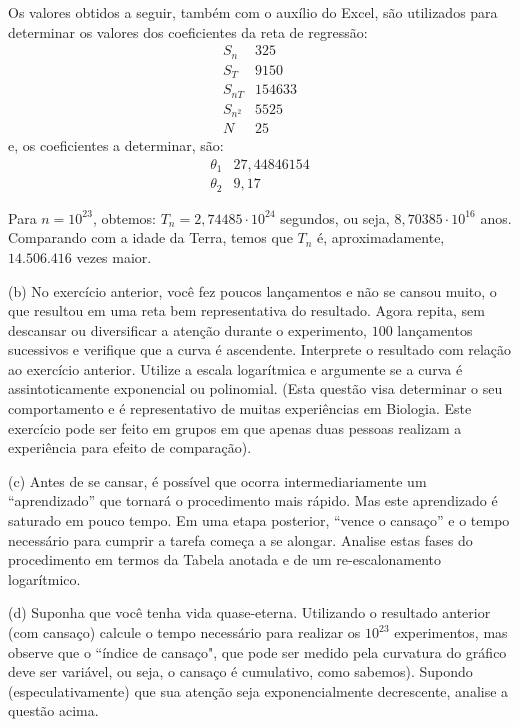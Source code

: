 \begin{exercise}
\begin{description}
{Os valores obtidos a seguir, também com o auxílio do Excel, são utilizados para determinar os valores dos coeficientes da reta de regressão:
\[
\begin{array}{c|c}
S_n & 325 \\ \hline
S_T & 9150 \\ \hline
S_{nT} & 154633 \\ \hline
S_{n^2} & 5525 \\ \hline
N & 25
\end{array}
\]
e, os coeficientes a determinar, são:
\[
\begin{array}{c|c}
\theta_1 & 27,44846154 \\ \hline
\theta_2 & 9,17
\end{array}
\]

Para \(n = 10^{23}\), obtemos: \(T_n = 2,74485 \cdot 10^{24}\) segundos, ou seja, \(8,70385 \cdot 10^{16}\) anos. Comparando com a idade da Terra, temos que \(T_n\) é, aproximadamente, \(14.506.416\) vezes maior.
}


\item (b) No exercício anterior, você fez poucos lançamentos e não se cansou muito, o que resultou em uma reta bem representativa do resultado. Agora repita, sem descansar ou diversificar a atenção durante o experimento, \(100\) lançamentos sucessivos e verifique que a curva é ascendente. Interprete o resultado com relação ao exercício anterior. Utilize a escala logarítmica e argumente se a curva é assintoticamente exponencial ou polinomial. (Esta questão visa determinar o seu comportamento e é representativo de muitas experiências em Biologia. Este exercício pode ser feito em grupos em que apenas duas pessoas realizam a experiência para efeito de comparação).

\item (c) Antes de se cansar, é possível que ocorra intermediariamente um ``aprendizado'' que tornará o procedimento mais rápido. Mas este aprendizado é saturado em pouco tempo. Em uma etapa posterior, ``vence o cansaço'' e o tempo necessário para cumprir a tarefa começa a se alongar. Analise estas fases do procedimento em termos da Tabela anotada e de um re-escalonamento logarítmico.

\item (d) Suponha que você tenha vida quase-eterna. Utilizando o resultado anterior (com cansaço) calcule o tempo necessário para realizar os \(10^{23}\) experimentos, mas observe que o ``índice de cansaço", que pode ser medido pela curvatura do gráfico deve ser variável, ou seja, o cansaço é cumulativo, como sabemos). Supondo (especulativamente) que sua atenção seja exponencialmente decrescente, analise a questão acima.
\end{description}
\end{exercise}

